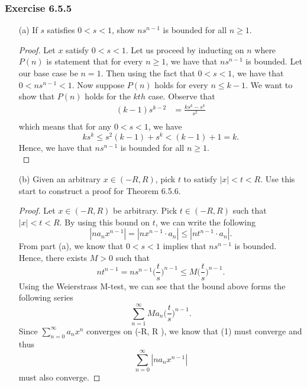 \subsubsection{Exercise 6.5.5} 
\begin{enumerate}
    \item[(a)] If \( s  \) satisfies \( 0 < s < 1  \), show \( ns^{n-1} \) is bounded for all \( n \geq 1  \).
        \begin{proof}
            Let \( x  \) satisfy \( 0 < s < 1  \). Let us proceed by inducting on \( n  \) where \( P(n) \) is statement that for every \( n \geq 1  \), we have that \( ns^{n-1}  \) is bounded. Let our base case be \( n = 1  \). Then using the fact that \( 0 < s < 1  \), we have that \(  0 < ns^{n-1} < 1 \). Now suppose \( P(n)  \) holds for every \( n \leq k -1  \). We want to show that \( P(n) \) holds for the \( kth \) case. Observe that 
            \begin{align*}
                (k-1)s^{k-2} &= \frac{ ks^k - s^k }{ s^2 }    \\
            \end{align*}
            which means that for any \( 0 < s < 1  \), we have 
            \[  ks^k \leq s^2(k -1) + s^k < (k-1) + 1 = k  .  \]
            Hence, we have that \( ns^{n-1}  \) is bounded for all \( n \geq 1  \).
            \[   \]
        \end{proof}
    \item[(b)] Given an arbitrary \( x \in (-R ,R ) \), pick \( t  \) to satisfy \( | x  |  < t < R  \). Use this start to construct a proof for Theorem 6.5.6.
        \begin{proof}
        Let \( x \in (-R ,R ) \) be arbitrary. Pick \( t \in (-R ,R ) \) such that \( | x  |  < t < R  \). By using this bound on \( t  \), we can write the following
        \[  | na_n x^{n-1}  | = | n x^{n-1} \cdot a_n  | \leq | n t^{n-1}  \cdot a_n |.\]
        From part (a), we know that \( 0 < s < 1  \) implies that \( n s^{n-1} \) is bounded. Hence, there exists \( M > 0  \) such that
        \[  n t^{n-1} = n s^{n-1} \Big( \frac{ t  }{ s  }  \Big)^{n-1} \leq M \Big( \frac{ t }{ s }  \Big)^{n-1}.  \]
        Using the Weierstrass M-test, we can see that the bound above forms the following series
        \[  \sum_{ n=1  }^{ \infty  } Ma_n \Big( \frac{ t }{ s  }  \Big)^{n-1} \tag{1}.\]
        Since \( \sum_{ n=0 }^{ \infty  } a_n x^n  \) converges on (-R, R ), we know that (1) must converge and thus 
        \[  \sum_{ n=0  }^{ \infty  } | na_n x^{n-1}  |  \] must also converge.
        \end{proof}
\end{enumerate}

